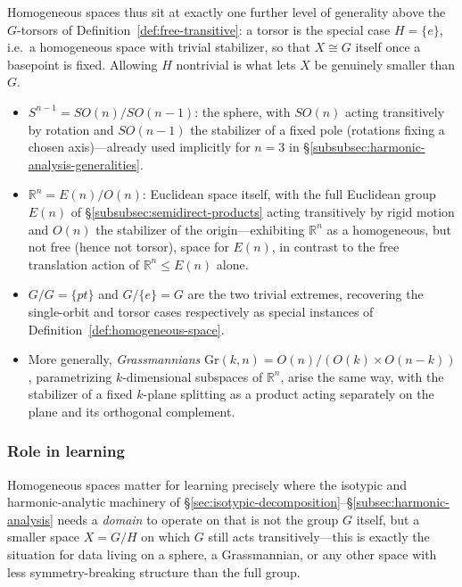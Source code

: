 \documentclass[mathematics,review,submit,moreauthors]{Definitions/mdpi}
\begin{document}
Homogeneous spaces thus sit at exactly one further level of generality above
the $G$-torsors of Definition~\ref{def:free-transitive}: a torsor is the
special case $H = \{e\}$, i.e.\ a homogeneous space with trivial stabilizer,
so that $X \cong G$ itself once a basepoint is fixed. Allowing $H$ nontrivial
is what lets $X$ be genuinely smaller than $G$.

\begin{Example}
\label{ex:homogeneous-spaces}
\begin{itemize}
    \item $S^{n-1} = SO(n)/SO(n-1)$: the sphere, with $SO(n)$ acting
    transitively by rotation and $SO(n-1)$ the stabilizer of a fixed pole
    (rotations fixing a chosen axis)---already used implicitly for $n=3$ in
    \S\ref{subsubsec:harmonic-analysis-generalities}.
    \item $\mathbb{R}^n = E(n) / O(n)$: Euclidean space itself, with the
    full Euclidean group $E(n)$ of \S\ref{subsubsec:semidirect-products}
    acting transitively by rigid motion and $O(n)$ the stabilizer of the
    origin---exhibiting $\mathbb{R}^n$ as a homogeneous, but not free
    (hence not torsor), space for $E(n)$, in contrast to the free
    translation action of $\mathbb{R}^n \leq E(n)$ alone.
    \item $G/G = \{pt\}$ and $G/\{e\} = G$ are the two trivial extremes,
    recovering the single-orbit and torsor cases respectively as special
    instances of Definition~\ref{def:homogeneous-space}.
    \item More generally, \emph{Grassmannians} $\mathrm{Gr}(k,n) =
    O(n)/(O(k)\times O(n-k))$, parametrizing $k$-dimensional subspaces of
    $\mathbb{R}^n$, arise the same way, with the stabilizer of a fixed
    $k$-plane splitting as a product acting separately on the plane and its
    orthogonal complement.
\end{itemize}
\end{Example}

\subsubsection{Role in learning}
\label{subsubsec:homogeneous-spaces-learning}

Homogeneous spaces matter for learning precisely where the isotypic and
harmonic-analytic machinery of
\S\ref{sec:isotypic-decomposition}--\S\ref{subsec:harmonic-analysis}
needs a \emph{domain} to operate on that is not the group $G$ itself, but a
smaller space $X = G/H$ on which $G$ still acts transitively---this is
exactly the situation for data living on a sphere, a Grassmannian, or any
other space with less symmetry-breaking structure than the full group.
\end{document}
